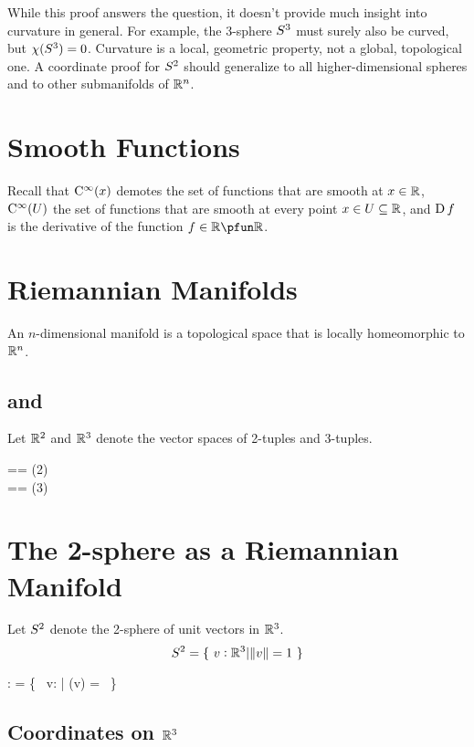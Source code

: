 \documentclass[11pt, oneside]{article}
\begin{document}
While this proof answers the question, it doesn't provide much insight into curvature in general.
For example, the 3-sphere $S^3$ must surely also be curved, but $\chi(S^3) = 0$.
Curvature is a local, geometric property, not a global, topological one.
A coordinate proof for $S^2$ should generalize to all higher-dimensional spheres and to other submanifolds of $\mathbb{R}^n$.

\section{Smooth Functions}

Recall that $\operatorname{C^{\infty}}(x)$ demotes the set of functions that are smooth at $x \in \mathbb{R}$, $\operatorname{C^{\infty}}(U)$ the set of functions that are smooth at
every point $x \in U \subseteq \mathbb{R}$, and $\operatorname{D} f$ is the derivative of the function $f \in \R \pfun \R$.

\section{Riemannian Manifolds}

An $n$-dimensional manifold is a topological space that is locally homeomorphic to $\mathbb{R}^n$.

\subsection{ and }

Let $\mathbb{R}^2$ and $\mathbb{R}^3$ denote the vector spaces of 2-tuples and 3-tuples.
\begin{zed}
	\Rtwo == \Rtuples(2) \\
	\Rthree == \Rtuples(3)
\end{zed}


\section{The 2-sphere as a Riemannian Manifold}

Let $S^2$ denote the 2-sphere of unit vectors in $\mathbb{R}^3$.
\begin{equation}
	S^2 = \{~ v: \mathbb{R}^3 | \norm{v} = 1 ~\}
\end{equation}

\begin{axdef}
	\Stwo: \power \Rthree
\where
	\Stwo = \{~ v: \Rthree | \normR(v) = \oneR ~\}
\end{axdef}

\subsection{Coordinates on $\mathbb{R}^3$}
\end{document}
